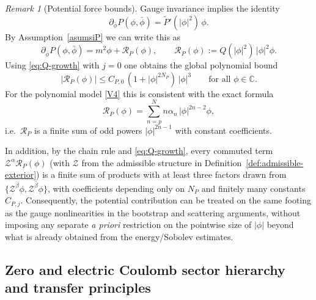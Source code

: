 \documentclass[11pt]{article}
\numberwithin{equation}{section}
\theoremstyle{plain}
\theoremstyle{definition}
\theoremstyle{remark}
\newtheorem{remark}{Remark}[section]
\begin{document}
\begin{remark}[Potential force bounds]\label{rem:potential-general}
Gauge invariance implies the identity
\begin{equation}\label{eq:potential-derivative}
\partial_{\bar\phi}P(\phi,\bar\phi)=\widetilde P'(|\phi|^{2})\,\phi.
\end{equation}
By Assumption~\ref{asumsiP} we can write this as
\begin{equation}\label{eq:potential-remainder}
\partial_{\bar\phi}P(\phi,\bar\phi)=m^{2}\phi+\mathcal R_{P}(\phi),
\qquad
\mathcal R_{P}(\phi):=Q(|\phi|^{2})\,|\phi|^{2}\phi.
\end{equation}
Using \eqref{eq:Q-growth} with $j=0$ one obtains the global polynomial bound
\begin{equation}\label{eq:potential-nonlinear-bound}
|\mathcal R_{P}(\phi)|
\le
C_{P,0}\,(1+|\phi|^{2N_{P}})\,|\phi|^{3}
\qquad\text{for all }\phi\in\mathbb{C}.
\end{equation}
For the polynomial model \eqref{V4} this is consistent with the exact formula
\begin{equation}
\mathcal R_{P}(\phi)=\sum_{n=p}^{N} n\alpha_{n}\,|\phi|^{2n-2}\phi,
\end{equation}
i.e.\ $\mathcal R_{P}$ is a finite sum of odd powers $|\phi|^{2n-1}$ with constant coefficients.

In addition, by the chain rule and \eqref{eq:Q-growth}, every commuted term $\mathcal Z^\alpha \mathcal R_{P}(\phi)$ (with $\mathcal Z$ from the admissible structure in Definition~\ref{def:admissible-exterior}) is a finite sum of products with at least three factors drawn from $\{\mathcal Z^{\beta}\phi,\overline{\mathcal Z^{\beta}\phi}\}$, with coefficients depending only on $N_{P}$ and finitely many constants $C_{P,j}$.
Consequently, the potential contribution can be treated on the same footing as the gauge nonlinearities in the bootstrap and scattering arguments, without imposing any separate \emph{a priori} restriction on the pointwise size of $|\phi|$ beyond what is already obtained from the energy/Sobolev estimates.
\end{remark}










\subsection{Zero and electric Coulomb sector hierarchy and transfer principles}\label{subsec:zero-sector-hierarchy}
\end{document}
